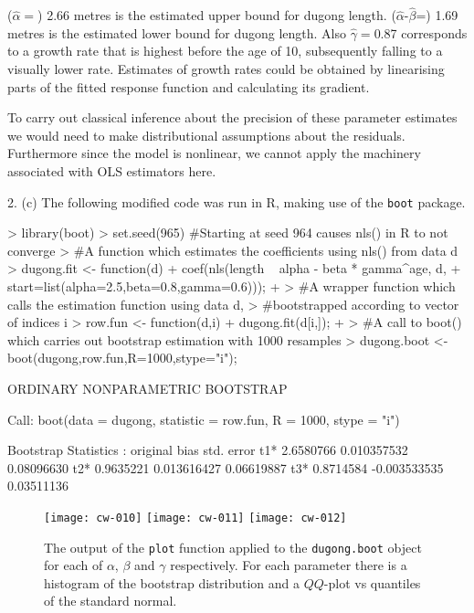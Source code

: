 \documentclass[a4paper,11pt]{article}
\begin{document}
($\hat\alpha=$) 2.66 metres is the estimated upper bound for dugong
length. ($\hat\alpha$-$\hat\beta$=) 1.69 metres is the estimated
lower bound for dugong length. Also $\hat\gamma=$0.87 corresponds to a
growth rate that is highest before the age of 10, subsequently falling to a
visually lower rate. Estimates of growth rates could be obtained by
linearising parts of the fitted response function and calculating its
gradient.

To carry out classical inference about the precision of these parameter
estimates we would need to make distributional assumptions about the
residuals. Furthermore since the model is nonlinear, we cannot apply
the machinery associated with OLS estimators here.

2. (c) The following modified code was run in R, making use of the
\texttt{boot} package.
\begin{Schunk}
\begin{Sinput}
> library(boot)
> set.seed(965) #Starting at seed 964 causes nls() in R to not converge
> #A function which estimates the coefficients using nls() from data d
> dugong.fit <- function(d) {
+     coef(nls(length ~ alpha - beta * gamma^age, d,
+           start=list(alpha=2.5,beta=0.8,gamma=0.6)));
+ }
> #A wrapper function which calls the estimation function using data d,
> #bootstrapped according to vector of indices i
> row.fun <- function(d,i) {
+  dugong.fit(d[i,]);
+ }
> #A call to boot() which carries out bootstrap estimation with 1000 resamples
> dugong.boot <- boot(dugong,row.fun,R=1000,stype="i");
\end{Sinput}
\end{Schunk}

\begin{Schunk}
\begin{Soutput}
ORDINARY NONPARAMETRIC BOOTSTRAP


Call:
boot(data = dugong, statistic = row.fun, R = 1000, stype = "i")


Bootstrap Statistics :
     original       bias    std. error
t1* 2.6580766  0.010357532  0.08096630
t2* 0.9635221  0.013616427  0.06619887
t3* 0.8714584 -0.003533535  0.03511136
\end{Soutput}
\end{Schunk}

\begin{figure}[h]
  \begin{center}
\texttt{[image: cw-010]}
\texttt{[image: cw-011]}
\texttt{[image: cw-012]}
\caption{The output of the \texttt{plot} function applied to the
  \texttt{dugong.boot} object for each of $\alpha$, $\beta$ and
  $\gamma$ respectively. For each parameter there is a histogram
  of the bootstrap distribution and a $QQ$-plot vs quantiles of the
  standard normal.}
\label{fig:plotboot}
\end{center}
\end{figure}
\end{document}
